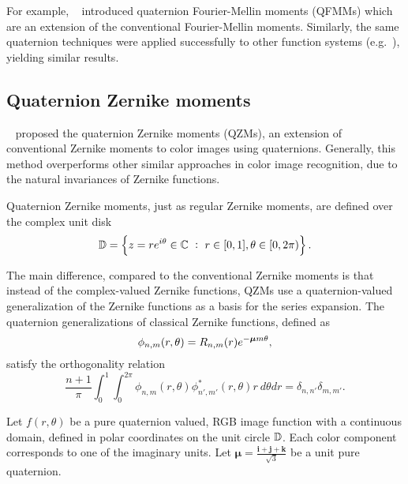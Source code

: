 
For example, \citeauthor{qfmm}~\cite{qfmm} introduced quaternion Fourier-Mellin moments (QFMMs) which are an extension of the conventional Fourier-Mellin moments. Similarly, the same quaternion techniques were applied successfully to other function systems (e.g.~\cite{bessel-fourier, chebyshev-fourier}), yielding similar results.


\subsection{Quaternion Zernike moments}\label{sec:qzm}
\citeauthor{qzm}~\cite{qzm,qzmi} proposed the quaternion Zernike moments (QZMs), an extension of conventional Zernike moments to color images using quaternions. Generally, this method overperforms other similar approaches in color image recognition, due to the natural invariances of Zernike functions.

Quaternion Zernike moments, just as regular Zernike moments, are defined over the complex unit disk
\[
	\D = \left\{ z = re^{i\theta}\in\C \ :\ r\in[0,1],\theta\in[0,2\pi)\right\}.
\]

The main difference, compared to the conventional Zernike moments is that instead of the complex-valued Zernike functions, QZMs use a quaternion-valued generalization of the Zernike functions as a basis for the series expansion. The quaternion generalizations of classical Zernike functions, defined as 
\[
	\phi_{n,m}(r,\theta) = R_{n,m}(r) e^{-\boldsymbol{\mu} m\theta},
\]
satisfy the orthogonality relation
\begin{equation}\label{QZortho}
	\frac{n+1}{\pi} \int_0^1 \int_0^{2\pi} \phi_{n,m}(r,\theta) \phi^*_{n',m'}(r,\theta) r \ d\theta dr = \delta_{n,n'}\delta_{m,m'}.
\end{equation}

Let $f(r,\theta)$ be a pure quaternion valued, RGB image function with a continuous domain, defined in polar coordinates on the unit circle $\mathbb{D}$. Each color component corresponds to one of the imaginary units. Let $\bm{\mu} = \frac{\mathbf{i} + \mathbf{j} + \mathbf{k}}{\sqrt{3}}$ be a unit pure quaternion.

